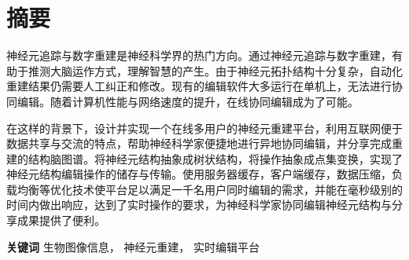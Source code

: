 \chapter{摘要}

神经元追踪与数字重建是神经科学界的热门方向。通过神经元追踪与数字重建，有助于推测大脑运作方式，理解智慧的产生。由于神经元拓扑结构十分复杂，自动化重建结果仍需要人工纠正和修改。现有的编辑软件大多运行在单机上，无法进行协同编辑。随着计算机性能与网络速度的提升，在线协同编辑成为了可能。

在这样的背景下，设计并实现一个在线多用户的神经元重建平台，利用互联网便于数据共享与交流的特点，帮助神经科学家便捷地进行异地协同编辑，并分享完成重建的结构脑图谱。将神经元结构抽象成树状结构，将操作抽象成点集变换，实现了神经元结构编辑操作的储存与传输。使用服务器缓存，客户端缓存，数据压缩，负载均衡等优化技术使平台足以满足一千名用户同时编辑的需求，并能在毫秒级别的时间内做出响应，达到了实时操作的要求，为神经科学家协同编辑神经元结构与分享成果提供了便利。

{
    \vspace{1em}
    \setlength{\parindent}{0em}
    \textbf{关键词} \; 生物图像信息， \; 神经元重建， \; 实时编辑平台 \par
}